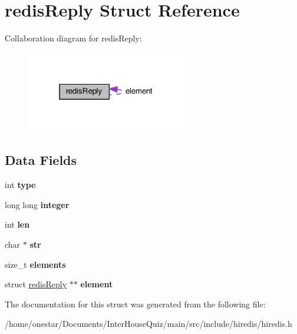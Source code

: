 \hypertarget{structredis_reply}{\section{redis\+Reply Struct Reference}
\label{structredis_reply}
}


Collaboration diagram for redis\+Reply\+:\nopagebreak
\begin{figure}[H]
\begin{center}
\leavevmode
\includegraphics[width=199pt]{structredis_reply__coll__graph}
\end{center}
\end{figure}
\subsection*{Data Fields}
\begin{DoxyCompactItemize}
\item 
\hypertarget{structredis_reply_ac765329451135abec74c45e1897abf26}{int {\bfseries type}}\label{structredis_reply_ac765329451135abec74c45e1897abf26}

\item 
\hypertarget{structredis_reply_a83220f2ab005ec8b1908e6f82876b856}{long long {\bfseries integer}}\label{structredis_reply_a83220f2ab005ec8b1908e6f82876b856}

\item 
\hypertarget{structredis_reply_afed088663f8704004425cdae2120b9b3}{int {\bfseries len}}\label{structredis_reply_afed088663f8704004425cdae2120b9b3}

\item 
\hypertarget{structredis_reply_ab50d783982593ef993ea0b68f7ad8b80}{char $\ast$ {\bfseries str}}\label{structredis_reply_ab50d783982593ef993ea0b68f7ad8b80}

\item 
\hypertarget{structredis_reply_a6c4e92edcfaa46a520c4d7ff8d74774c}{size\+\_\+t {\bfseries elements}}\label{structredis_reply_a6c4e92edcfaa46a520c4d7ff8d74774c}

\item 
\hypertarget{structredis_reply_a7933f8fe57b1810e393f781e4f8806e5}{struct \hyperlink{structredis_reply}{redis\+Reply} $\ast$$\ast$ {\bfseries element}}\label{structredis_reply_a7933f8fe57b1810e393f781e4f8806e5}

\end{DoxyCompactItemize}


The documentation for this struct was generated from the following file\+:\begin{DoxyCompactItemize}
\item 
/home/onestar/\+Documents/\+Inter\+House\+Quiz/main/src/include/hiredis/hiredis.\+h\end{DoxyCompactItemize}
